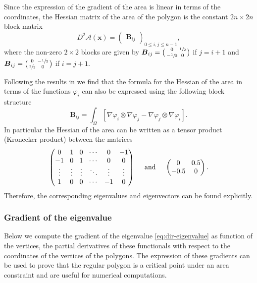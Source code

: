 \documentclass[JEP,XML,SOM,Unicode,ThmDefs,NoFloatCountersInSection,published]{cedram}
\newenvironment{smallpmatrix}{\big(\begin{smallmatrix}}{\end{smallmatrix}\big)}
\theoremstyle{plain}
\theoremstyle{definition}
\newcommand{\bo}[1]{{\boldsymbol#1}}
\begin{document}
Since the expression of the gradient of the area is linear in terms of the coordinates, the Hessian matrix of the area of the polygon is the constant $2n\times 2n$ block matrix
\begin{equation}
D^2 \mathcal A(\bo x) = \begin{pmatrix}
\bo B_{ij}
\end{pmatrix}_{0\leq i,j\leq n-1},
\label{eq:Hess_area}
\end{equation}
where the non-zero $2\times 2$ blocks are given by $\bo B_{ij} = \begin{smallpmatrix}0& \sfrac12 \\ -\sfrac12 & 0 \end{smallpmatrix}$ if $j = i+1$ and $\bo B_{ij} = \begin{smallpmatrix}0& -\sfrac12 \\ \sfrac12 & 0 \end{smallpmatrix}$ if $i = j+1$.

Following the results in \cite{laurain2ndDeriv} we find that the formula for the Hessian of the area in terms of the functions $\varphi_i$ can also be expressed using the following block structure
\begin{equation}
\bo B_{ij} = \int_\Omega [ \nabla \varphi_i \otimes \nabla \varphi_j - \nabla \varphi_j \otimes \nabla \varphi_i]
\label{eq:hess_area_phi}.
\end{equation}
In particular the Hessian of the area can be written as a tensor product (Kronecker product) between the matrices\enlargethispage{\baselineskip}
\[
\arraycolsep4.4pt \begin{pmatrix}
0 & 1 & 0 & \cdots & 0 & -1 \\
-1 & 0 & 1 & \cdots & 0 & 0\\
\vdots & \vdots & \vdots & \ddots & \vdots &
\vdots \\
1 & 0 & 0 & \cdots & -1 & 0
\end{pmatrix} \quad\text{ and }\quad \begin{pmatrix}
0 & 0.5 \\ -0.5 & 0
\end{pmatrix}.
\]
Therefore, the corresponding eigenvalues and eigenvectors can be found explicitly.

\subsubsection*{Gradient of the eigenvalue} Below we compute the gradient of the eigenvalue \eqref{eq:dir-eigenvalue} as function of the vertices, \ie the partial derivatives of these functionals with respect to the coordinates of the vertices of the polygons. The expression of these gradients can be used to prove that the regular polygon is a critical point under an area constraint and are useful for numerical computations.
\end{document}

